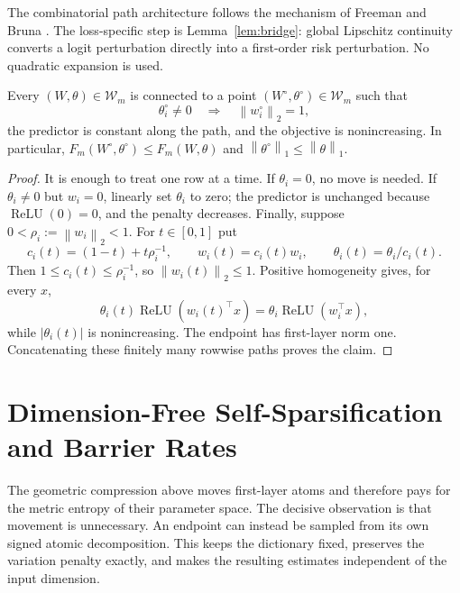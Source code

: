 \documentclass[smallextended,envcountsect]{svjour3}
\newcommand{\relu}{\operatorname{ReLU}}
\newcommand{\norm}[1]{\left\lVert #1 \right\rVert}
\newcommand{\abs}[1]{\left\lvert #1 \right\rvert}
\begin{document}
\begin{remark}\label{rem:novelty}
The combinatorial path architecture follows the mechanism of Freeman and Bruna \cite{FreemanBruna2017}. The loss-specific step is Lemma~\ref{lem:bridge}: global Lipschitz continuity converts a logit perturbation directly into a first-order risk perturbation. No quadratic expansion is used.
\end{remark}

\begin{lemma}\label{lem:sphericalize}
Every $(W,\theta)\in\mathcal W_m$ is connected to a point $(W^\circ,\theta^\circ)\in\mathcal W_m$ such that
\begin{equation}
\theta_i^\circ\ne0
\quad\Longrightarrow\quad
\norm{w_i^\circ}_2=1,
\label{eq:spherical-active}
\end{equation}
the predictor is constant along the path, and the objective is nonincreasing. In particular,
$F_m(W^\circ,\theta^\circ)\le F_m(W,\theta)$ and
$\norm{\theta^\circ}_1\le\norm{\theta}_1$.
\end{lemma}

\begin{proof}
It is enough to treat one row at a time. If $\theta_i=0$, no move is needed. If $\theta_i\ne0$ but $w_i=0$, linearly set $\theta_i$ to zero; the predictor is unchanged because $\relu(0)=0$, and the penalty decreases. Finally, suppose $0<\rho_i:=\norm{w_i}_2<1$. For $t\in[0,1]$ put
\[
c_i(t)=(1-t)+t\rho_i^{-1},
\qquad
w_i(t)=c_i(t)w_i,
\qquad
\theta_i(t)=\theta_i/c_i(t).
\]
Then $1\le c_i(t)\le\rho_i^{-1}$, so $\norm{w_i(t)}_2\le1$. Positive
homogeneity gives, for every $x$,
\[
 \theta_i(t)\relu(w_i(t)^\top x)=\theta_i\relu(w_i^\top x),
\]
while $\abs{\theta_i(t)}$ is nonincreasing. The endpoint has first-layer norm
one. Concatenating these finitely many rowwise paths proves the claim.
\end{proof}

\section{Dimension-Free Self-Sparsification and Barrier Rates}\label{sec:rates}

The geometric compression above moves first-layer atoms and therefore pays for
the metric entropy of their parameter space.  The decisive observation is that
movement is unnecessary.  An endpoint can instead be sampled from its own
signed atomic decomposition.  This keeps the dictionary fixed, preserves the
variation penalty exactly, and makes the resulting estimates independent of
the input dimension.
\end{document}
